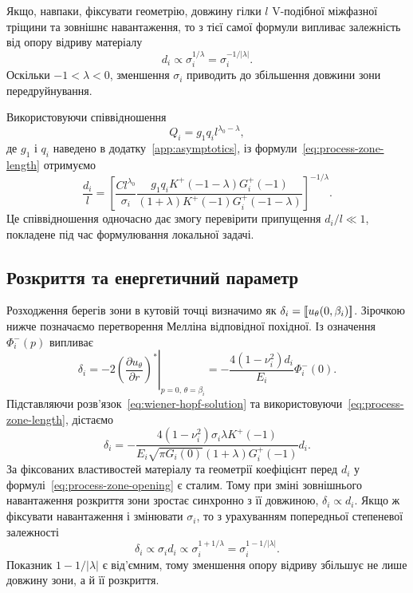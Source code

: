 Якщо, навпаки, фіксувати геометрію, довжину гілки $l$ V-подібної
міжфазної тріщини та зовнішнє навантаження, то з тієї самої формули випливає залежність від
опору відриву матеріалу
\begin{equation*}
  d_i\propto \sigma_i^{1/\lambda}
  =\sigma_i^{-1/|\lambda|}.
\end{equation*}
Оскільки $-1<\lambda<0$, зменшення $\sigma_i$ приводить до збільшення
довжини зони передруйнування.

Використовуючи співвідношення
\begin{equation*}
  Q_i=g_1q_i l^{\lambda_0-\lambda},
\end{equation*}
де $g_1$ і $q_i$ наведено в додатку~\ref{app:asymptotics}, із
формули~\eqref{eq:process-zone-length} отримуємо
\begin{equation}
\label{eq:normalized-process-zone-length}
  \frac{d_i}{l}=
  \left[
    \frac{Cl^{\lambda_0}}{\sigma_i}
    \frac{g_1q_iK^+(-1-\lambda)G_i^+(-1)}
    {(1+\lambda)K^+(-1)G_i^+(-1-\lambda)}
  \right]^{-1/\lambda}.
\end{equation}
Це співвідношення одночасно дає змогу перевірити припущення
$d_i/l\ll1$, покладене під час формулювання локальної задачі.

\subsection{Розкриття та енергетичний параметр}
\label{subsec:zone-parameters}

Розходження берегів зони в кутовій точці визначимо як
$\delta_i=\left[\!\left[u_\theta(0,\beta_i)\right]\!\right]$. Зірочкою нижче позначаємо
перетворення Мелліна відповідної похідної. Із означення $\Phi_i^-(p)$
випливає
\begin{equation*}
  \delta_i
  =-2
    \left.
      \left(\frac{\partial u_\theta}{\partial r}\right)^*
    \right|_{p=0,\,\theta=\beta_i}
  =-\frac{4(1-\nu_i^2)d_i}{E_i}\Phi_i^-(0).
\end{equation*}
Підставляючи розв'язок~\eqref{eq:wiener-hopf-solution} та
використовуючи~\eqref{eq:process-zone-length}, дістаємо
\begin{equation}
\label{eq:process-zone-opening}
  \delta_i=
  -\frac{4(1-\nu_i^2)\sigma_i\lambda K^+(-1)}
  {E_i\sqrt{\pi G_i(0)}(1+\lambda)G_i^+(-1)}d_i.
\end{equation}
За фіксованих властивостей матеріалу та геометрії коефіцієнт перед $d_i$
у формулі~\eqref{eq:process-zone-opening} є сталим. Тому при зміні
зовнішнього навантаження розкриття зони зростає синхронно з її довжиною,
$\delta_i\propto d_i$. Якщо ж фіксувати навантаження і змінювати
$\sigma_i$, то з урахуванням попередньої степеневої залежності
\begin{equation*}
  \delta_i\propto \sigma_i d_i
  \propto \sigma_i^{1+1/\lambda}
  =\sigma_i^{1-1/|\lambda|}.
\end{equation*}
Показник $1-1/|\lambda|$ є від'ємним, тому зменшення опору відриву
збільшує не лише довжину зони, а й її розкриття.

